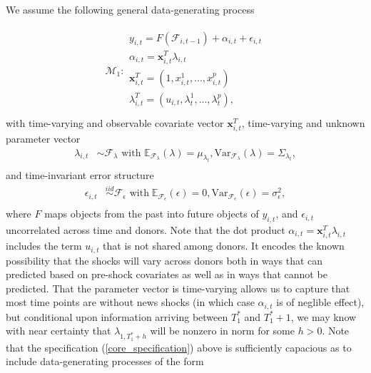 \documentclass{uiucthesis2021}
\newcommand{\xx}{\textbf{x}}
\newcommand{\simiid}{\stackrel{iid}{\sim}} %
\newcommand{\indep}{\perp \!\!\! \perp } %
\def\mrm#1{\mathrm{#1}} %
\def\mc#1{\mathcal{#1}} %
\def\E{\mathbb{E}} %
\def\mc#1{\mathcal{#1}}
\theoremstyle{definition}
\begin{document}
  We assume the following general data-generating process
  
    \begin{align}
      \mc{M}_1 \colon \begin{array}{l}
        y_{i,t} = F(\mathcal{F}_{i,t-1}) + \alpha_{i,t} + \epsilon_{i,t}\\[.2cm]\label{core_specification}
        \alpha_{i,t} = \xx^{T}_{i,t}\lambda_{i,t} \\[.2cm]
       \xx_{i,t}^{T} = (1,x^{1}_{i,t},...,x^{p}_{i,t})\\[.2cm] 
       \lambda_{i,t}^{T} = (u_{i,t},\lambda^{1}_{t},...,\lambda^{p}_{t}),\\[.2cm]
      \end{array}
      \end{align}
  with time-varying and observable covariate vector $\xx_{i,t}^{T}$, time-varying and unknown parameter vector
  \begin{align*}
  \lambda_{i,t} &\sim \mc{F}_{\lambda}\text{ with }  \E_{\mathcal{F}_{\lambda}}(\lambda) = \mu_{\lambda_{t}}, \mrm{Var}_{\mc{F}_{\lambda}}(\lambda) = \Sigma_{\lambda_{t}},\\
  \end{align*}
  and time-invariant error structure
    \begin{align*}
      \epsilon_{i,t} &\simiid \mc{F}_{\epsilon} \text{ with}  \; \E_{\mc{F}_{\epsilon}}(\epsilon) = 0, \mrm{Var}_{\mc{F}_{\epsilon}}(\epsilon)  = \sigma^{2}_{\epsilon},  \\
      \end{align*}
  where $F$ maps objects from the past into future objects of $y_{i,t}$, and $\epsilon_{i,t}$ uncorrelated across time and donors.  Note that the dot product $\alpha_{i,t} = \xx^{T}_{i,t}\lambda_{i,t}$ includes the term $u_{i,t}$ that is not shared among donors.  It encodes the known possibility that the shocks will vary across donors both in ways that can predicted based on pre-shock covariates as well as in ways that cannot be predicted.  That the parameter vector is time-varying allows us to capture that most time points are without news shocks (in which case $\alpha_{i,t}$ is of neglible effect), but conditional upon information arriving between $T_{1}^{*}$ and $T_{1}^{*}+1$, we may know with near certainty that $\lambda_{1,T_{1}^{*}+h}$ will be nonzero in norm for some $h>0$.  Note that the specification (\ref{core_specification}) above is sufficiently capacious as to include data-generating processes of the form 
  
\end{document}
